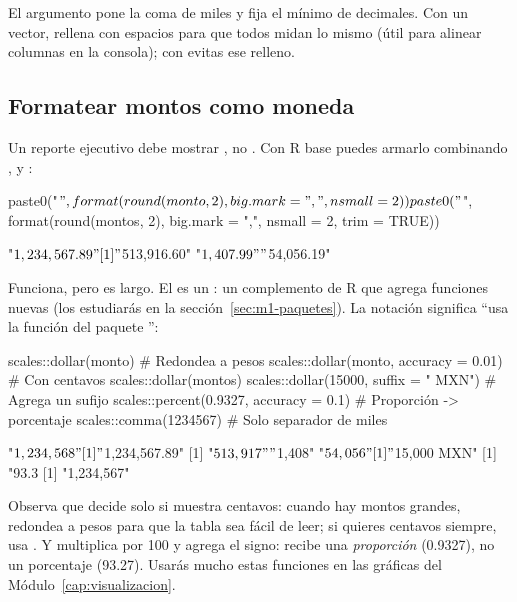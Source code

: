 El argumento  pone la coma de miles y 
fija el mínimo de decimales. Con un vector,  rellena con
espacios para que todos midan lo mismo (útil para alinear columnas en la
consola); con  evitas ese relleno.

\subsection{Formatear montos como moneda}

Un reporte ejecutivo debe mostrar , no
. Con R base puedes armarlo combinando
,  y :

\begin{rcode}
paste0("$", format(round(monto, 2), big.mark = ",", nsmall = 2))
paste0("$", format(round(montos, 2), big.mark = ",", nsmall = 2,
                   trim = TRUE))
\end{rcode}
\begin{rsalida}
[1] "$1,234,567.89"
[1] "$513,916.60" "$1,407.99"   "$54,056.19" 
\end{rsalida}

Funciona, pero es largo. El  es un : un
complemento de R que agrega funciones nuevas (los estudiarás en la
sección~\ref{sec:m1-paquetes}). La notación 
significa ``usa la función  del paquete
'':

\begin{rcode}
scales::dollar(monto)                        # Redondea a pesos
scales::dollar(monto, accuracy = 0.01)       # Con centavos
scales::dollar(montos)
scales::dollar(15000, suffix = " MXN")       # Agrega un sufijo
scales::percent(0.9327, accuracy = 0.1)      # Proporción -> porcentaje
scales::comma(1234567)                       # Solo separador de miles
\end{rcode}
\begin{rsalida}
[1] "$1,234,568"
[1] "$1,234,567.89"
[1] "$513,917" "$1,408"   "$54,056" 
[1] "$15,000 MXN"
[1] "93.3%
[1] "1,234,567"
\end{rsalida}

Observa que  decide solo si muestra centavos: cuando hay
montos grandes, redondea a pesos para que la tabla sea fácil de leer; si
quieres centavos siempre, usa . Y
 multiplica por 100 y agrega el signo: recibe una
\emph{proporción} (0.9327), no un porcentaje (93.27). Usarás mucho estas
funciones en las gráficas del Módulo~\ref{cap:visualizacion}.

